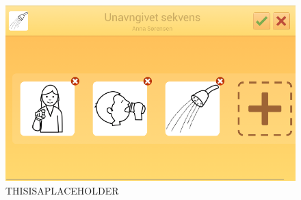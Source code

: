 \begin{figure} [H]
\centering
\includegraphics[width=14cm]{Pics/Sprint3/EditModeCropped}
\caption{THISISAPLACEHOLDER}
\label{fig:magicshit}
\end{figure}
